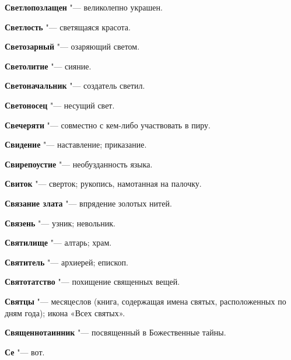 \begin{mymulticols}{2}
\noindent\textbf{Светлопозлащен} "--- великолепно украшен. 




\noindent\textbf{Светлость} "--- светящаяся красота. 




\noindent\textbf{Светозарный} "--- озаряющий светом. 




\noindent\textbf{Светолитие} "--- сияние. 




\noindent\textbf{Светоначальник} "--- создатель светил. 




\noindent\textbf{Светоносец} "--- несущий свет. 




\noindent\textbf{Свечеряти} "--- совместно с кем-либо участвовать в пиру. 




\noindent\textbf{Свидение} "--- наставление; приказание. 




\noindent\textbf{Свирепоустие} "--- необузданность языка. 




\noindent\textbf{Свиток} "--- сверток; рукопись, намотанная на палочку. 




\noindent\textbf{Связание злата} "--- впрядение золотых нитей. 




\noindent\textbf{Связень} "--- узник; невольник. 




\noindent\textbf{Святилище} "--- алтарь; храм. 




\noindent\textbf{Святитель} "--- архиерей; епископ. 




\noindent\textbf{Святотатство} "--- похищение священных вещей. 




\noindent\textbf{Святцы} "--- месяцеслов (книга, содержащая имена святых, расположенных по дням года); икона «Всех святых». 




\noindent\textbf{Священнотаинник} "--- посвященный в Божественные тайны. 




\noindent\textbf{Се} "--- вот. 





\end{mymulticols}
